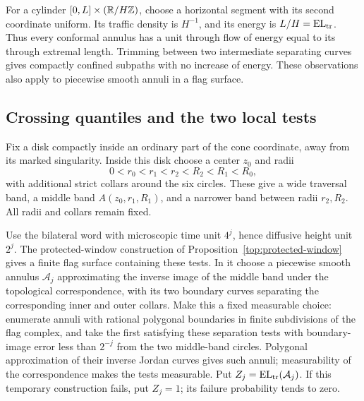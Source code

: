 For a cylinder \([0,L]\times(\mathbb R/H\mathbb Z)\), choose a horizontal segment
with its second coordinate uniform.  Its traffic density is \(H^{-1}\),
and its energy is \(L/H=\operatorname{EL}_{\rm tr}\).  Thus every conformal annulus
has a unit through flow of energy equal to its through extremal length.
Trimming between two intermediate separating curves gives compactly
confined subpaths with no increase of energy.  These observations also
apply to piecewise smooth annuli in a flag surface.

\subsection{Crossing quantiles and the two local tests}
\label{conf:quantile-subsection}

Fix a disk compactly inside an ordinary part of the cone coordinate,
away from its marked singularity.  Inside this disk choose a center
\(z_0\) and radii
\[
 0<r_0<r_1<r_2<R_2<R_1<R_0,
\]
with additional strict collars around the six circles.  These give a
wide traversal band, a middle band \(A(z_0,r_1,R_1)\), and a narrower
band between radii \(r_2,R_2\).  All radii and collars remain fixed.

Use the bilateral word with microscopic time unit \(4^j\), hence
diffusive height unit \(2^j\).  The protected-window construction of
Proposition~\ref{top:protected-window} gives a finite flag surface
containing these tests.  In it choose a piecewise smooth annulus
\(\mathcal A_j\) approximating the inverse image of the middle
band under the topological correspondence, with its two boundary curves
separating the corresponding inner and outer collars.  Make this a
fixed measurable choice: enumerate annuli with rational polygonal
boundaries in finite subdivisions of the flag complex, and take the
first satisfying these separation tests with boundary-image error
less than \(2^{-j}\) from the two middle-band circles.  Polygonal
approximation of their inverse Jordan curves gives such annuli;
measurability of the correspondence makes the tests measurable.  Put
\(Z_j=\operatorname{EL}_{\rm tr}(\mathcal A_j)\).  If this temporary construction
fails, put \(Z_j=1\); its failure probability tends to zero.

